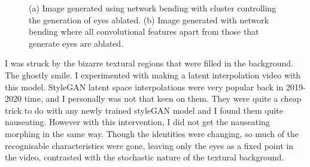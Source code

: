 \begin{figure}[!htbp]
    \hfill
    \hfill
    \caption{(a) Image generated using network bending with cluster controlling the generation of eyes ablated. (b) Image generated with network bending where all convolutional features apart from those that generate eyes are ablated.}
    \label{fig:c7:eyes-no-eyes}
 \end{figure}

I was struck by the bizarre textural regions that were filled in the background. 
The ghostly smile. 
I experimented with making a latent interpolation video with this model. StyleGAN latent space interpolations were very popular back in 2019-2020 time, and I personally was not that keen on them. 
They were quite a cheap trick to do with any newly trained styleGAN model and I found them quite nauseating. 
However with this intervention, I did not get the nauseating morphing in the same way. 
Though the identities were changing, so much of the recognisable characteristics were gone, leaving only the eyes as a fixed point in the video, contrasted with the stochastic nature of the textural background. 

